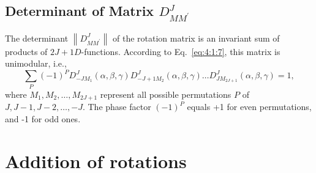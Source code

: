 \subsection{Determinant of Matrix $D_{M M^{\prime}}^{J}$}\label{sec:4.6.4}
The determinant $\left\|D_{M M^{\prime}}^{J}\right\|$ of the rotation matrix is an invariant sum of products of $2 J+1 D$-functions. According to Eq.~\eqref{eq:4:1:7}, this matrix is unimodular, i.e.,
\begin{equation}
\sum_{P}(-1)^{P} D_{-J M_{1}}^{J}(\alpha, \beta, \gamma) D_{-J+1 M_{2}}^{J}(\alpha, \beta, \gamma) \ldots D_{J M_{2 J+1}}^{J}(\alpha, \beta, \gamma)=1 ,\label{eq:4:6:15}
\end{equation}
where $M_{1}, M_{2}, \ldots, M_{2 J+1}$ represent all possible permutations $P$ of $J, J-1, J-2, \ldots,-J$. The phase factor $(-1)^{P}$ equals +1 for even permutations, and -1 for odd ones.

\section{Addition of rotations}\label{sec:4.7}
